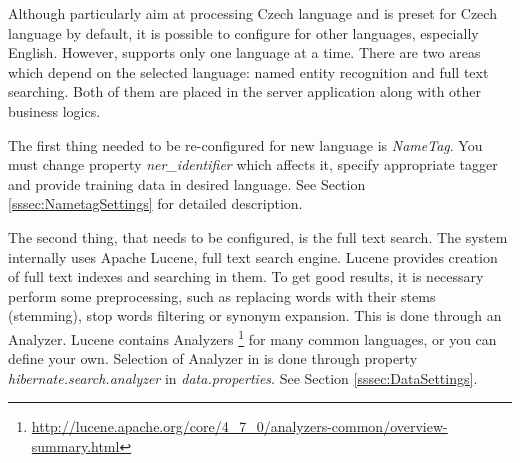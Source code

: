 
Although \textan{} particularly aim at processing Czech language and is preset for
Czech language by default, it is possible to configure \textan{} for other languages,
especially English. However, \textit{} supports only one language at a time. There are
two areas which depend on the selected language: named entity recognition and full
text searching. Both of them are placed in the server application along with other
business logics.

The first thing needed to be re-configured for new language is {\it NameTag}. 
You must change property {\it ner\_identifier}
which affects it, specify appropriate tagger and provide
training data in desired language. See Section \ref{sssec:NametagSettings} for
detailed description.

The second thing, that needs to be configured, is the full text search. The system
internally uses Apache Lucene, full text search engine. Lucene provides creation
of full text indexes and searching in them. To get good results, it is necessary
perform some preprocessing, such as replacing words with their stems (stemming),
stop words filtering or synonym expansion. This is done through an Analyzer.
Lucene contains Analyzers%
\footnote{\url{http://lucene.apache.org/core/4_7_0/analyzers-common/overview-summary.html}}
for many common languages, or you can define your own. Selection of Analyzer in 
\textan{} is done through property \emph{hibernate.search.analyzer} in
\emph{data.properties}. See Section \ref{sssec:DataSettings}.
